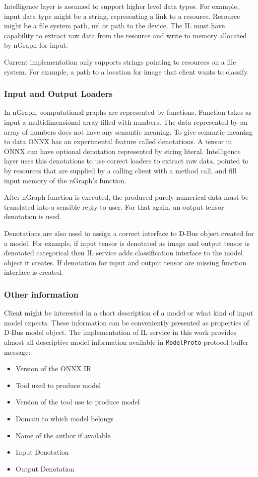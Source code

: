 \documentclass[english, 12pt, a4paper, elec, utf8, online]{aaltothesis}
\begin{document}
Intelligence layer is assumed to support higher level data types. For example, input data type might be a string, representing a link to a resource. Resource might be a file system path, url or path to the device. The IL must have capability to extract raw data from the resource and write to memory allocated by nGraph for input. 

Current implementation only supports strings pointing to resources on a file system. For example, a path to a location for image that client wants to classify.      

\subsubsection{Input and Output Loaders} 
In nGraph, computational graphs are represented by functions. Function takes as input a multidimensional array filled with numbers. The data represented by an array of numbers does not have any semantic meaning. To give semantic meaning to data ONNX has an experimental feature called denotations. A tensor in ONNX can have optional denotation represented by string literal. Intelligence layer uses this denotations to use correct loaders to extract raw data, pointed to by resources that are supplied by a calling client with a method call, and fill input memory of the nGraph's function. 

After nGraph function is executed, the produced purely numerical data must be translated into a sensible reply to user. For that again, an output tensor denotation is used.        
  
Denotations are also used to assign a correct interface to D-Bus object created for a model. For example, if input tensor is denotated as image and output tensor is denotated categorical then IL service adds classification interface to the model object it creates. If denotation for input and output tensor are missing function interface is created.               
                  
\subsubsection{Other information}
Client might be interested in a short description of a model or what kind of input model expects. These information can be conveniently presented as properties of D-Bus model object. The implementation of IL service in this work provides almost all descriptive model information available in \texttt{ModelProto} protocol buffer message:
\begin{itemize}
\item
Version of the ONNX IR
\item
Tool used to produce model
\item
Version of the tool use to produce model
\item
Domain to which model belongs
\item
Name of the author if available
\item
Input Denotation
\item
Output Denotation
\end{itemize}
\end{document}
